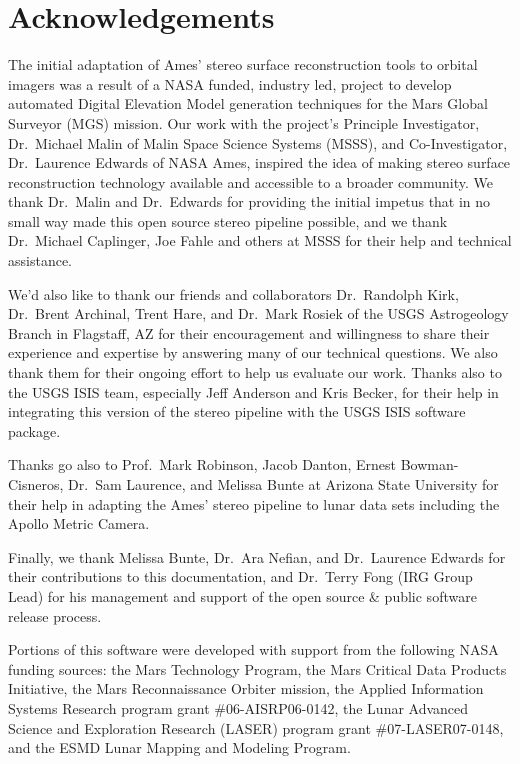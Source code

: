 \section*{Acknowledgements}

The initial adaptation of Ames' stereo surface reconstruction tools to
orbital imagers was a result of a NASA funded, industry led, project
to develop automated Digital Elevation Model generation techniques for
the Mars Global Surveyor (MGS) mission. Our work with the project's
Principle Investigator, Dr.~Michael Malin of Malin Space Science
Systems (MSSS), and Co-Investigator, Dr.~Laurence Edwards of NASA
Ames, inspired the idea of making stereo surface reconstruction
technology available and accessible to a broader community.  We thank
Dr.~Malin and Dr.~Edwards for providing the initial impetus that in no
small way made this open source stereo pipeline possible, and we thank
Dr.~Michael Caplinger, Joe Fahle and others at MSSS for their help and
technical assistance.

We'd also like to thank our friends and collaborators Dr.~Randolph
Kirk, Dr.~Brent Archinal, Trent Hare, and Dr.~Mark Rosiek of the USGS
Astrogeology Branch in Flagstaff, AZ for their encouragement and
willingness to share their experience and expertise by answering many
of our technical questions.  We also thank them for their ongoing
effort to help us evaluate our work.  Thanks also to the USGS ISIS
team, especially Jeff Anderson and Kris Becker, for their help in
integrating this version of the stereo pipeline with the USGS ISIS
software package.

Thanks go also to Prof.~Mark Robinson, Jacob Danton, Ernest
Bowman-Cisneros, Dr.~Sam Laurence, and Melissa Bunte at Arizona State
University for their help in adapting the Ames' stereo pipeline to
lunar data sets including the Apollo Metric Camera.

Finally, we thank Melissa Bunte, Dr.~Ara Nefian, and Dr.~Laurence
Edwards for their contributions to this documentation, and Dr.~Terry
Fong (IRG Group Lead) for his management and support of the open
source \& public software release process.

Portions of this software were developed with support from the
following NASA funding sources: the Mars Technology Program, the Mars
Critical Data Products Initiative, the Mars Reconnaissance Orbiter
mission, the Applied Information Systems Research program grant
\#06-AISRP06-0142, the Lunar Advanced Science and Exploration Research
(LASER) program grant \#07-LASER07-0148, and the ESMD Lunar Mapping and
Modeling Program.
